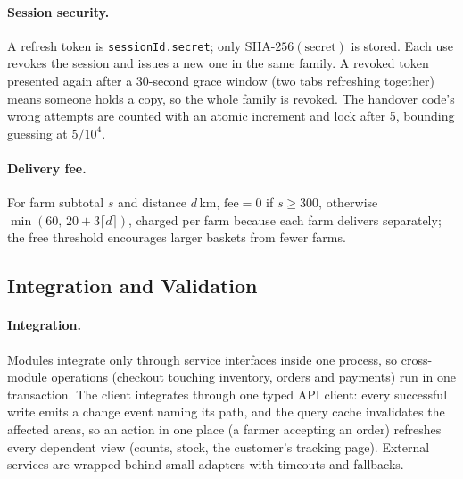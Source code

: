 \documentclass[manuscript,screen,review]{acmart}
\begin{document}
\paragraph{Session security.} A refresh token is \texttt{sessionId.secret}; only $\text{SHA-256}(\text{secret})$ is stored. Each use revokes the session and issues a new one in the same family. A revoked token presented again after a 30-second grace window (two tabs refreshing together) means someone holds a copy, so the whole family is revoked. The handover code's wrong attempts are counted with an atomic increment and lock after 5, bounding guessing at $5/10^4$.

\paragraph{Delivery fee.} For farm subtotal $s$ and distance $d$\,km, $\text{fee} = 0$ if $s \ge 300$, otherwise $\min(60,\, 20 + 3\lceil d\rceil)$, charged per farm because each farm delivers separately; the free threshold encourages larger baskets from fewer farms.

\subsection{Integration and Validation}
\label{sec:validation}

\paragraph{Integration.} Modules integrate only through service interfaces inside one process, so cross-module operations (checkout touching inventory, orders and payments) run in one transaction. The client integrates through one typed API client: every successful write emits a change event naming its path, and the query cache invalidates the affected areas, so an action in one place (a farmer accepting an order) refreshes every dependent view (counts, stock, the customer's tracking page). External services are wrapped behind small adapters with timeouts and fallbacks.
\end{document}
